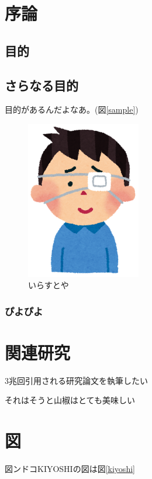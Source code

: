 \section{序論}

\subsection{目的}

\subsection{さらなる目的}

目的があるんだよなあ。(図\ref{sample})

\begin{figure}[ht]
    \centering
    \includegraphics[width=5cm,height=\textheight]{images/832df7abe16316dd63d148a41f11614f.png}
    \caption{いらすとや\label{sample}}
    \label{fig:832df7abe16316dd63d148a41f11614f.png}
\end{figure}

\subsubsection{ぴよぴよ}

\section{関連研究}

3兆回引用される研究論文を執筆したい\cite{hoge}

それはそうと山椒はとても美味しい\cite{fuga}

\section{図}

図ンドコKIYOSHIの図は図\ref{kiyoshi}

